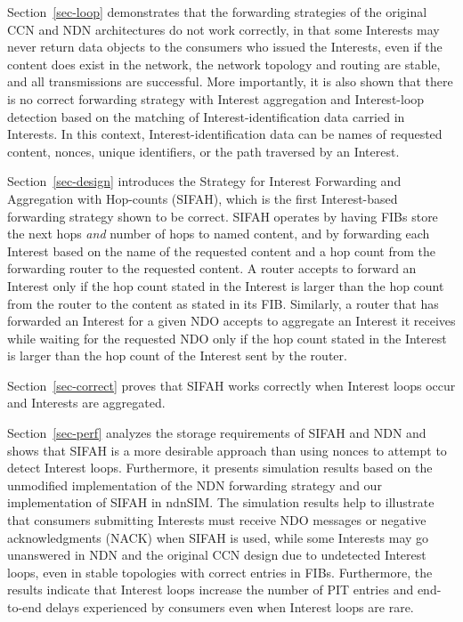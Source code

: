 \documentclass{ancs15-alternate}
\begin{document}
Section~\ref{sec-loop} demonstrates that the forwarding strategies of  the original CCN and NDN  architectures \cite{ccn, ndn-fw, ndn-paper} do not work correctly,  in that  some Interests may never return data objects  to the  consumers who issued  the Interests, even if the content does exist in the network, the network topology and routing are stable, and all transmissions are successful. 
More importantly, it is also shown that there is no correct forwarding strategy with Interest aggregation and   Interest-loop detection  based on the matching of  
Interest-identification data  carried in Interests. In this context, 
Interest-identification data can be names of requested content, nonces, unique identifiers, or the path traversed by an Interest.

Section~\ref{sec-design} introduces  the Strategy for Interest  Forwarding and Aggregation with Hop-counts  (SIFAH), which is the first Interest-based forwarding strategy  shown to be correct.
SIFAH operates by  having FIBs store the next hops {\em and} number of hops to named content, and by forwarding each Interest based on  the name of the requested content and a hop count from the forwarding router to the requested content.
A router accepts to forward an Interest only if the hop count stated in the Interest is larger than the hop count from the router to the content as stated in its FIB. Similarly, a router that has forwarded an Interest for a given NDO accepts to aggregate an Interest it receives while waiting for the requested NDO only if the hop count stated in the Interest is larger than the hop count of the Interest  sent by the router.

Section~\ref{sec-correct} proves that SIFAH works correctly when Interest loops occur and Interests are aggregated. 

Section~\ref{sec-perf} analyzes the storage requirements of SIFAH and NDN and shows that  SIFAH is a more desirable approach than using nonces to attempt to detect Interest loops. Furthermore, it presents simulation results based on the unmodified   implementation of the NDN forwarding strategy and  our implementation of SIFAH in ndnSIM. The simulation results 
help to illustrate  that consumers submitting Interests must receive NDO messages or negative acknowledgments (NACK) when SIFAH is used, while 
some Interests may go unanswered in
NDN and the original CCN design due to undetected Interest loops, even in stable topologies with correct entries in FIBs. Furthermore, the results indicate that Interest loops increase the number of PIT entries and end-to-end delays experienced by consumers even when Interest loops are rare.
\end{document}
